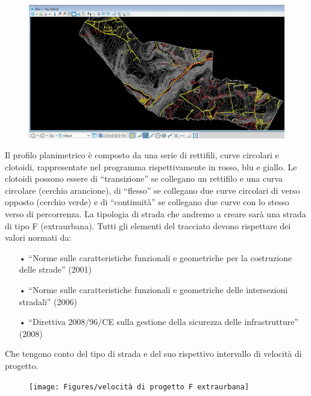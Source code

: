 \begin{figure}[H]
	\centering
	\includegraphics[width=\linewidth]{Figures/tracciato stradale completo}
    \label{fig:tracciato stradale completo}
\end{figure}

Il profilo planimetrico è composto da una serie di rettifili, curve circolari e clotoidi, rappresentate nel programma rispettivamente in rosso, blu e giallo.
Le clotoidi possono essere di “transizione” se collegano un rettifilo e una curva circolare (cerchio arancione), di “flesso” se collegano due curve circolari di verso opposto (cerchio verde) e di “continuità” se collegano due curve con lo stesso verso di percorrenza.
La tipologia di strada che andremo a creare sarà una strada di tipo F (extraurbana). Tutti gli elementi del tracciato devono rispettare dei valori normati da:

\begin{itemize}
	\item[•] “Norme sulle caratteristiche funzionali e geometriche per la costruzione delle strade” (2001)
	\item[•] “Norme sulle caratteristiche funzionali e geometriche delle intersezioni stradali” (2006)
	\item[•] “Direttiva 2008/96/CE sulla gestione della sicurezza delle infrastrutture” (2008)
\end{itemize}

Che tengono conto del tipo di strada e del suo rispettivo intervallo di velocità di progetto.

\begin{figure}[H]
	\centering
	\texttt{[image: Figures/velocità di progetto F extraurbana]}
    \label{fig:velocità di progetto F extraurbana}
\end{figure}

